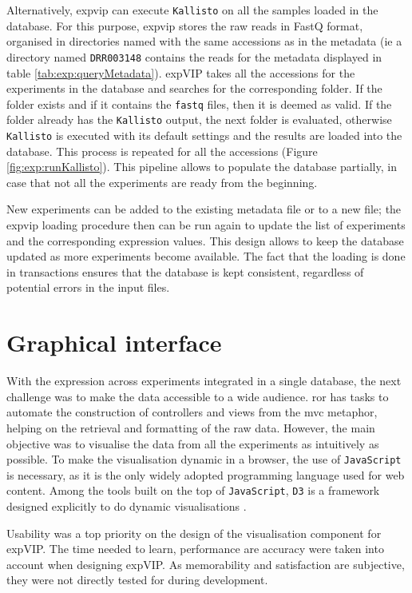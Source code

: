 Alternatively, \gls{expvip} can execute \verb|Kallisto| on all the samples loaded in the database. 
For this purpose, \gls{expvip} stores the raw reads in FastQ format, organised in directories named with the same accessions as in the metadata (ie a directory named \verb|DRR003148| contains the reads for the metadata displayed in table \ref{tab:exp:queryMetadata}). 
expVIP takes all the accessions for the experiments in the database and searches for the corresponding folder. 
If the folder exists and if it contains the \verb|fastq| files, then it is deemed as valid. 
If the folder already has the \verb|Kallisto| output, the next folder is evaluated, otherwise \verb|Kallisto| is executed with its default settings and the results are loaded into the database. 
This process is repeated for all the accessions (Figure \ref{fig:exp:runKallisto}).  
This pipeline allows to populate the database partially, in case that not all the experiments are ready from the beginning. 

New experiments can be added to the existing metadata file  or to a new file; the \gls{expvip} loading procedure then can be run again to update the list of experiments and the corresponding expression values. 
This design allows to keep the database updated as more experiments become available. 
The fact that the loading is done in transactions ensures that the database is kept consistent, regardless of potential errors in the input files. 

\section{Graphical interface}
\label{exp:gui}  
With the expression across experiments integrated in a single database, the next challenge was to make the data accessible to a wide audience. 
\acrshort{ror} has tasks to automate the construction of controllers and views from the \acrshort{mvc} metaphor, helping on the retrieval and formatting of the raw data. 
However, the main objective was to visualise the data from all the experiments as intuitively as possible. 
To make the visualisation dynamic in a browser, the use of \verb|JavaScript| is necessary, as it is the only widely adopted programming language used for web content. 
Among the tools built on the top of \verb|JavaScript|, \verb|D3| is a framework designed explicitly to do dynamic visualisations \citep{Bostock2011}. 

Usability was a top priority on the design of the visualisation component for expVIP. 
The time needed to learn, performance are accuracy were taken into account when designing expVIP. 
As memorability and satisfaction are subjective, they were not directly tested for during development.  


